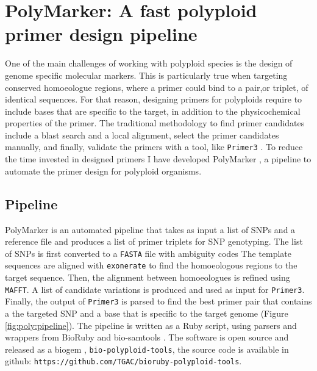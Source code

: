 
\chapter{PolyMarker: A fast polyploid primer design pipeline}
One of the main challenges of working with polyploid species is the design of genome specific molecular markers. 
This is particularly true when targeting conserved homoeologue regions, where a primer could bind to a pair,or triplet, of identical sequences. 
For that reason, designing primers for polyploids require to include bases that are specific to the target, in addition to the physicochemical properties of the primer.  
The traditional methodology to find primer candidates include a blast search and a local alignment, select the primer candidates manually, and finally, validate the primers with a tool, like \texttt{Primer3} \citep{Rozen}. 
To reduce the time invested in designed primers I have developed PolyMarker \citep{Ramirez-Gonzalez2015a}, a pipeline to automate the primer design for polyploid organisms.  

\section{Pipeline}
PolyMarker is an automated pipeline that takes as input a list of SNPs and a reference file and produces a list of primer triplets for SNP genotyping. 
The list of SNPs is first converted to a \texttt{FASTA} file with ambiguity codes\citep{Cornish-Bowden1985} 
The template sequences are aligned with \texttt{exonerate} \citep{Slater2005}  to find the homoeologous regions to the target sequence. 
Then, the alignment between homoeologues is refined using \texttt{MAFFT}\citep{Katoh2013}. 
A list of candidate variations is produced and used as input for \texttt{Primer3}\citep{Rozen}. 
Finally, the output of \texttt{Primer3} is parsed to find the best primer pair that contains a the targeted SNP and a base that is specific to the target genome (Figure \ref{fig:poly:pipeline}).  
The pipeline is written as a Ruby script, using parsers and wrappers from BioRuby \citep{Goto2010} and bio-samtools \citep{Etherington2015,Ramirez-Gonzalez2012}. 
The software is open source and released as a biogem \citep{Bonnal2012}, \texttt{bio-polyploid-tools}, the source code is available in github: \texttt{https://github.com/TGAC/bioruby-polyploid-tools}.

